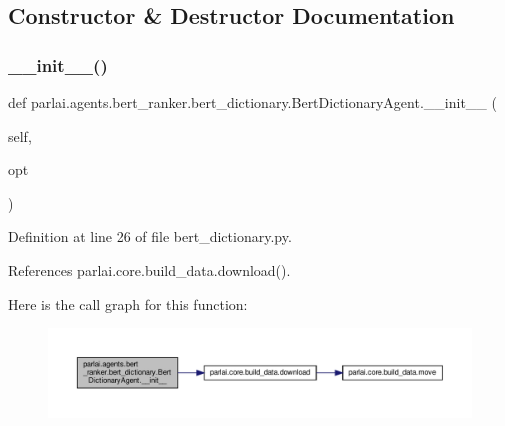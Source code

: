 \subsection{Constructor \& Destructor Documentation}
\mbox{\label{classparlai_1_1agents_1_1bert__ranker_1_1bert__dictionary_1_1BertDictionaryAgent_aedf3441c187fc809926e490a9cab9875}} 
\subsubsection{\texorpdfstring{\+\_\+\+\_\+init\+\_\+\+\_\+()}{\_\_init\_\_()}}
{\footnotesize\ttfamily def parlai.\+agents.\+bert\+\_\+ranker.\+bert\+\_\+dictionary.\+Bert\+Dictionary\+Agent.\+\_\+\+\_\+init\+\_\+\+\_\+ (\begin{DoxyParamCaption}\item[{}]{self,  }\item[{}]{opt }\end{DoxyParamCaption})}



Definition at line 26 of file bert\+\_\+dictionary.\+py.



References parlai.\+core.\+build\+\_\+data.\+download().

Here is the call graph for this function\+:
\nopagebreak
\begin{figure}[H]
\begin{center}
\leavevmode
\includegraphics[width=350pt]{classparlai_1_1agents_1_1bert__ranker_1_1bert__dictionary_1_1BertDictionaryAgent_aedf3441c187fc809926e490a9cab9875_cgraph}
\end{center}
\end{figure}


